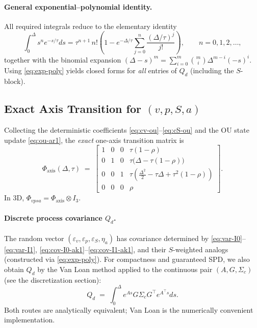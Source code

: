 \documentclass[10pt]{extarticle}
\begin{document}
\paragraph{General exponential--polynomial identity.}
All required integrals reduce to the elementary identity
\begin{equation}
\int_0^\Delta s^n e^{-s/\tau} ds
= \tau^{n+1}\,n!\left(1 - e^{-\Delta/\tau}\sum_{j=0}^{n}\frac{(\Delta/\tau)^j}{j!}\right),
\qquad n=0,1,2,\dots,
\label{eq:exp-poly}
\end{equation}
together with the binomial expansion $(\Delta-s)^m=\sum_{i=0}^m \binom{m}{i}\Delta^{m-i}(-s)^i$.
Using \eqref{eq:exp-poly} yields closed forms for \emph{all} entries of $Q_d$ (including the $S$-block).

\subsection{Exact Axis Transition for $(v,p,S,a)$}
Collecting the deterministic coefficients \eqref{eq:cv-ou}--\eqref{eq:cS-ou} and the OU state update \eqref{eq:ou-ar1},
the \emph{exact} one-axis transition matrix is
\begin{equation}
\Phi_{\text{axis}}(\Delta,\tau) \;=\;
\begin{bmatrix}
1 & 0 & 0 & \tau(1-\rho)\\
0 & 1 & 0 & \tau\big(\Delta - \tau(1-\rho)\big)\\
0 & 0 & 1 & \tau\left(\tfrac{\Delta^2}{2} - \tau\Delta + \tau^2(1-\rho)\right)\\
0 & 0 & 0 & \rho
\end{bmatrix}.
\label{eq:Phi-axis-ou}
\end{equation}
In 3D, $\Phi_{vpsa}=\Phi_{\text{axis}}\otimes I_3$.

\paragraph{Discrete process covariance $Q_d$.}
The random vector $(\varepsilon_v,\varepsilon_p,\varepsilon_S,\eta_a)$ has covariance determined by
\eqref{eq:var-I0}--\eqref{eq:var-I1}, \eqref{eq:cov-I0-ak1}--\eqref{eq:cov-I1-ak1}, and their $S$-weighted analogs
(constructed via \eqref{eq:exp-poly}). For compactness and guaranteed SPD, we also obtain $Q_d$
by the Van Loan method applied to the continuous pair $(A,G,\Sigma_c)$ (see the discretization section):
\[
Q_d \;=\; \int_0^\Delta e^{A s} G \Sigma_c G^\top e^{A^\top s} ds.
\]
Both routes are analytically equivalent; Van Loan is the numerically convenient implementation.
\end{document}
